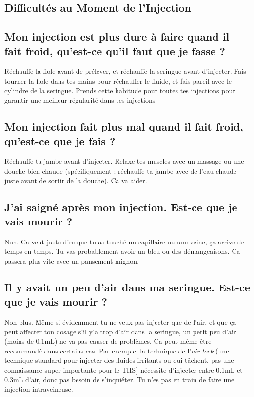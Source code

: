 \documentclass{article}
\begin{document}
\subsection*{Difficultés au Moment de l'Injection}

\subsection{Mon injection est plus dure à faire quand il fait froid, qu'est-ce qu'il faut que je fasse ?}

Réchauffe la fiole avant de prélever, et réchauffe la seringue avant d'injecter. Fais tourner la fiole dans tes mains pour réchauffer le fluide, et fais pareil avec le cylindre de la seringue. Prends cette habitude pour toutes tes injections pour garantir une meilleur régularité dans tes injections.  

\subsection{Mon injection fait plus mal quand il fait froid, qu'est-ce que je fais ?}

Réchauffe ta jambe avant d'injecter. Relaxe tes muscles avec un massage ou une douche bien chaude (spécifiquement : réchauffe ta jambe avec de l'eau chaude juste avant de sortir de la douche). Ca va aider.

\subsection{J'ai saigné après mon injection. Est-ce que je vais mourir ?}

Non. Ca veut juste dire que tu as touché un capillaire ou une veine, ça arrive de temps en temps. Tu vas probablement avoir un bleu ou des démangeaisons. Ca passera plus vite avec un pansement mignon.

\subsection{Il y avait un peu d'air dans ma seringue. Est-ce que je vais mourir ?}\label{7-7}

Non plus. Même si évidemment tu ne veux pas injecter que de l'air, et que ça peut affecter ton dosage s'il y'a trop d'air dans la seringue, un petit peu d'air (moins de 0.1mL) ne va pas causer de problèmes. Ca peut même être recommandé dans certains cas. Par exemple, la technique de l'\textit{air lock} (une technique standard pour injecter des fluides irritants ou qui tâchent, pas une connaissance super importante pour le THS) nécessite d'injecter entre 0.1mL et 0.3mL d'air, donc pas besoin de s'inquiéter. Tu n'es pas en train de faire une injection intraveineuse.
\end{document}
